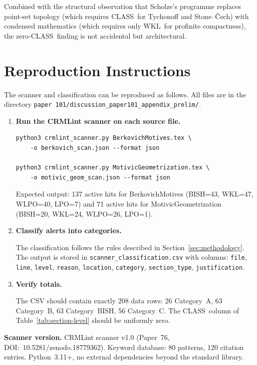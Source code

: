 \documentclass[11pt]{article}
\newcommand{\BISH}{\textsf{BISH}}
\newcommand{\WKL}{\textsf{WKL}}
\newcommand{\WLPO}{\textsf{WLPO}}
\newcommand{\LPO}{\textsf{LPO}}
\newcommand{\CLASS}{\textsf{CLASS}}
\begin{document}
Combined with the structural observation that Scholze's programme
replaces point-set topology (which requires \CLASS\ for Tychonoff and
Stone--\v{C}ech) with condensed mathematics (which requires only \WKL\
for profinite compactness), the zero-\CLASS\ finding is not accidental
but architectural.

\section{Reproduction Instructions}
\label{sec:reproduction}

The scanner and classification can be reproduced as follows.
All files are in the directory
\texttt{paper~101/discussion\_paper101\_appendix\_prelim/}.

\begin{enumerate}
\item \textbf{Run the CRMLint scanner on each source file.}

\begin{verbatim}
python3 crmlint_scanner.py BerkovichMotives.tex \
    -o berkovich_scan.json --format json

python3 crmlint_scanner.py MotivicGeometrization.tex \
    -o motivic_geom_scan.json --format json
\end{verbatim}

Expected output: 137 active hits for BerkovichMotives
(\BISH=43, \WKL=47, \WLPO=40, \LPO=7)
and 71 active hits for MotivicGeometrization
(\BISH=20, \WKL=24, \WLPO=26, \LPO=1).

\item \textbf{Classify alerts into categories.}

The classification follows the rules described in
Section~\ref{sec:methodology}.  The output is stored in
\texttt{scanner\_classification.csv} with columns:
\texttt{file}, \texttt{line}, \texttt{level}, \texttt{reason},
\texttt{location}, \texttt{category}, \texttt{section\_type},
\texttt{justification}.

\item \textbf{Verify totals.}

The CSV should contain exactly 208 data rows:
26 Category~A, 63 Category~B, 63 Category~\BISH,
56 Category~C.  The \CLASS\ column of
Table~\ref{tab:section-level} should be uniformly zero.
\end{enumerate}

\bigskip

\noindent\textbf{Scanner version.}
CRMLint scanner v1.0 (Paper~76, DOI:~10.5281/zenodo.18779362).
Keyword database: 80 patterns, 120 citation entries.
Python~3.11+, no external dependencies beyond the standard library.
\end{document}

